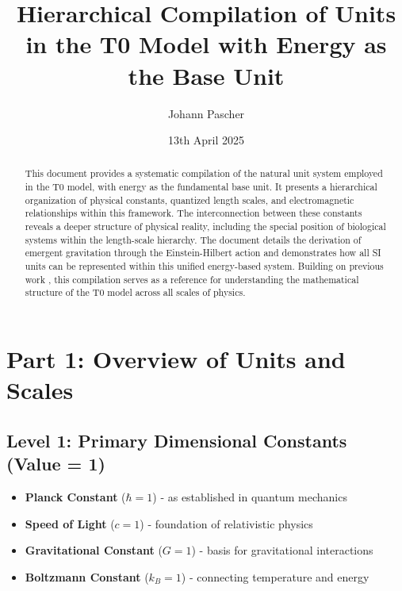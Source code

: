 \documentclass[12pt,a4paper]{article}
\begin{document}
	
	\title{Hierarchical Compilation of Units in the T0 Model with Energy as the Base Unit}
	\author{Johann Pascher}
	\date{13th April 2025}
	\maketitle
	
	\begin{abstract}
		This document provides a systematic compilation of the natural unit system employed in the T0 model, with energy as the fundamental base unit. It presents a hierarchical organization of physical constants, quantized length scales, and electromagnetic relationships within this framework. The interconnection between these constants reveals a deeper structure of physical reality, including the special position of biological systems within the length-scale hierarchy. The document details the derivation of emergent gravitation through the Einstein-Hilbert action and demonstrates how all SI units can be represented within this unified energy-based system. Building on previous work \cite{pascher_planck_2025, pascher_alpha_2025, pascher_alphabeta_2025}, this compilation serves as a reference for understanding the mathematical structure of the T0 model across all scales of physics.
	\end{abstract}
	
	\section*{Part 1: Overview of Units and Scales}
	
	\subsection*{Level 1: Primary Dimensional Constants (Value = 1)}
	\begin{itemize}[itemsep=0.5em]
		\item \textbf{Planck Constant} ($\hbar = 1$) - as established in quantum mechanics \cite{planck1901}
		\item \textbf{Speed of Light} ($c = 1$) - foundation of relativistic physics \cite{einstein1905}
		\item \textbf{Gravitational Constant} ($G = 1$) - basis for gravitational interactions \cite{newton1687}
		\item \textbf{Boltzmann Constant} ($k_B = 1$) - connecting temperature and energy \cite{boltzmann1872}
	\end{itemize}
	
\end{document}
